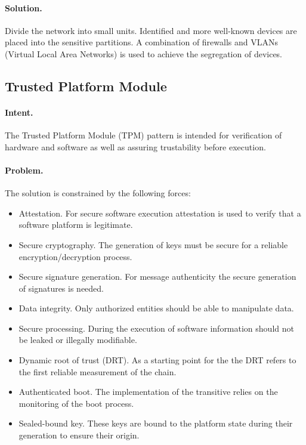 \paragraph{\textbf{Solution.}} Divide the network into small units. Identified and more well-known devices are placed into the sensitive partitions. A combination of firewalls and VLANs (Virtual Local Area Networks) is used to achieve the segregation of devices.   


\subsection{Trusted Platform Module~\cite{Munoz2020}} 
\label{p:tpm}

\paragraph{\textbf{Intent.}} The Trusted Platform Module (TPM) pattern is intended for verification of hardware and software as well as  assuring trustability before execution. 

\paragraph{\textbf{Problem.}} The solution is constrained by the following forces:
\begin{itemize}
	\item Attestation. For secure software execution attestation is used to verify that a software platform is legitimate.
	\item Secure cryptography. The generation of keys must be secure for a reliable encryption/decryption process.
	\item Secure signature generation. For message authenticity the secure generation of signatures is needed. 
	\item Data integrity. Only authorized entities should be able to manipulate data. 
	\item Secure processing. During the execution of software information should not be leaked or illegally modifiable.
	\item Dynamic root of trust (DRT). As a starting point for the  the DRT refers to the first reliable measurement of the chain.
	\item Authenticated boot. The implementation of the transitive  relies on the monitoring of the boot process. 
	\item Sealed-bound key. These keys are bound to the platform state during their generation to ensure their origin.
\end{itemize}

